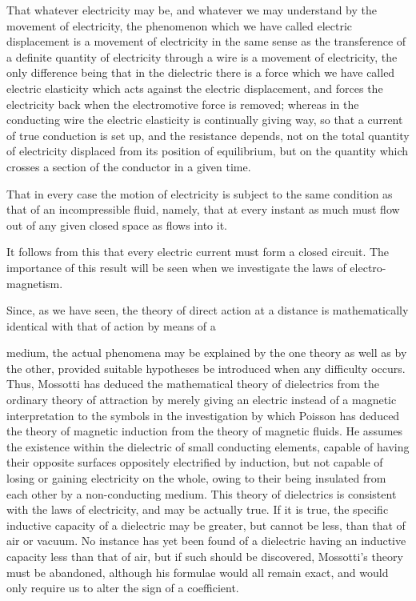 \documentclass[11pt,a4paper]{article}
\begin{document}
That whatever electricity may be, and whatever we may understand by
the movement of electricity, the phenomenon which we have called electric
displacement is a movement of electricity in the same sense as the
transference of a definite quantity of electricity through a wire is a
movement of electricity, the only difference being that in the dielectric
there is a force which we have called electric elasticity which acts
against the electric displacement, and forces the electricity back when
the electromotive force is removed; whereas in the conducting wire the
electric elasticity is continually giving way, so that a current of true
conduction is set up, and the resistance depends, not on the total
quantity of electricity displaced from its position of equilibrium, but
on the quantity which crosses a section of the conductor in a given
time.

That in every case the motion of electricity is subject to the same
condition as that of an incompressible fluid, namely, that at every
instant as much must flow out of any given closed space as flows into it.

It follows from this that every electric current must form a closed
circuit. The importance of this result will be seen when we investigate
the laws of electro-magnetism.

Since, as we have seen, the theory of direct action at a distance is
mathematically identical with that of action by means of a

\clearpage
\setcounter{footnote}{0}

medium, the actual phenomena may be explained by the one theory as
well as by the other, provided suitable hypotheses be introduced when
any difficulty occurs. Thus, Mossotti has deduced the mathematical
theory of dielectrics from the ordinary theory of attraction by merely
giving an electric instead of a magnetic interpretation to the symbols
in the investigation by which Poisson has deduced the theory of magnetic
induction from the theory of magnetic fluids. He assumes the existence
within the dielectric of small conducting elements, capable of having
their opposite surfaces oppositely electrified by induction, but not
capable of losing or gaining electricity on the whole, owing to their
being insulated from each other by a non-conducting medium. This theory
of dielectrics is consistent with the laws of electricity, and may be
actually true. If it is true, the specific inductive capacity of a
dielectric may be greater, but cannot be less, than that of air or
vacuum. No instance has yet been found of a dielectric having an
inductive capacity less than that of air, but if such should be
discovered, Mossotti's theory must be abandoned, although his formulae
would all remain exact, and would only require us to alter the sign of
a coefficient.
\end{document}
